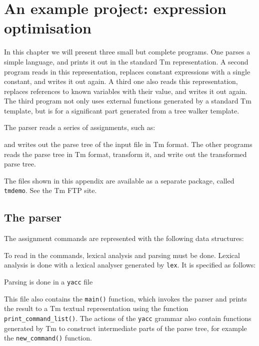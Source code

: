 \chapter{An example project: expression optimisation}
\label{s.calc}
In this chapter we will present three small but complete programs.
One parses a simple language, and prints it out in the standard Tm
representation. A second program reads in this representation, replaces
constant expressions with a single constant, and writes it out again.
A third one also reads this representation, replaces references to
known variables with their value, and writes it out again.
The third program not only uses external functions generated by a
standard Tm template, but is for a significant part generated from
a tree walker template.

The parser reads a series of assignments, such as:
\begin{showfile}
\end{showfile}
and writes out the parse tree of the input file in Tm format.
The other programs reads the parse tree in Tm format, transform it,
and write out the transformed parse tree.

The files shown in this appendix are available as a separate package,
called \verb'tmdemo'. See the Tm FTP site.

\section{The parser}
\label{s.calcparser}
The assignment commands are represented with the following data structures:
\begin{showfile}
\end{showfile}

To read in the commands, lexical analysis and parsing must be done.
Lexical analysis is done with a lexical analyser generated by
\texttt{lex}. It is specified as follows:
\begin{showfile}
\end{showfile}

Parsing is done in a \texttt{yacc} file
\begin{showfile}
\end{showfile}

This file also contains the \verb'main()' function, which invokes the
parser and prints the result to a Tm textual representation using the
function \verb'print_command_list()'. The actions of the \texttt{yacc}
grammar also contain functions generated by Tm to construct intermediate 
parts of the parse tree, for example the \verb'new_command()' function.

